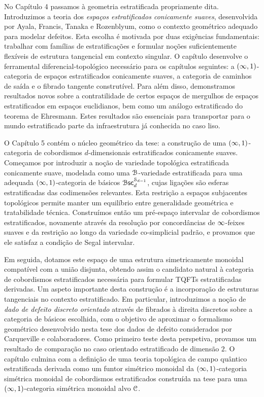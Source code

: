 No Capítulo 4 passamos à geometria estratificada propriamente dita. Introduzimos a teoria dos \emph{espaços estratificados conicamente suaves}, desenvolvida por Ayala, Francis, Tanaka e Rozenblyum, como o contexto geométrico adequado para modelar defeitos. Esta escolha é motivada por duas exigências fundamentais: trabalhar com famílias de estratificações e formular noções suficientemente flexíveis de estrutura tangencial em contexto singular. O capítulo desenvolve o ferramental diferencial-topológico necessário para os capítulos seguintes: a $(\operatorname{\infty},1)$-categoria de espaços estratificados conicamente suaves, a categoria de caminhos de saída e o fibrado tangente construtível. Para além disso, demonstramos resultados novos sobre a contratilidade de certos espaços de mergulhos de espaços estratificados em espaços euclidianos, bem como um análogo estratificado do teorema de Ehresmann. Estes resultados são essenciais para transportar para o mundo estratificado parte da infraestrutura já conhecida no caso liso.

O Capítulo 5 contém o núcleo geométrico da tese: a construção de uma $(\operatorname{\infty},1)$-categoria de cobordismos $d$-dimensionais estratificados conicamente suaves. Começamos por introduzir a noção de variedade topológica estratificada conicamente suave, modelada como uma $\mathcal B$-variedade estratificada para uma adequada $(\operatorname{\infty},1)$-categoria de básicos $\operatorname{\mathcal B\mathsf{sc}}_{d}^{\mathcal S_{d-1}}$, cujas ligações são esferas estratificadas das codimensões relevantes. Esta restrição a espaços subjacentes topológicos permite manter um equilíbrio entre generalidade geométrica e tratabilidade técnica. Construímos então um pré-espaço intervalar de cobordismos estratificados, novamente através da resolução por concordâncias de $\operatorname{\infty}$-feixes suaves e da restrição ao longo da variedade co-simplicial padrão, e provamos que ele satisfaz a condição de Segal intervalar.

Em seguida, dotamos este espaço de uma estrutura simetricamente monoidal compatível com a união disjunta, obtendo assim o candidato natural à categoria de cobordismos estratificados necessária para formular TQFTs estratificadas derivadas. Um aspeto importante desta construção é a incorporação de estruturas tangenciais no contexto estratificado. Em particular, introduzimos a noção de \emph{dado de defeito discreto orientado} através de fibrados à direita discretos sobre a categoria de básicos escolhida, com o objetivo de aproximar o formalismo geométrico desenvolvido nesta tese dos dados de defeito considerados por Carqueville e colaboradores. Como primeiro teste desta perspetiva, provamos um resultado de comparação no caso orientado estratificado de dimensão $2$. O capítulo culmina com a definição de uma teoria topológica de campo quântico estratificada derivada como um funtor simétrico monoidal da $(\operatorname{\infty},1)$-categoria simétrica monoidal de cobordismos estratificados construída na tese para uma $(\operatorname{\infty},1)$-categoria simétrica monoidal alvo $\mathcal C$.

